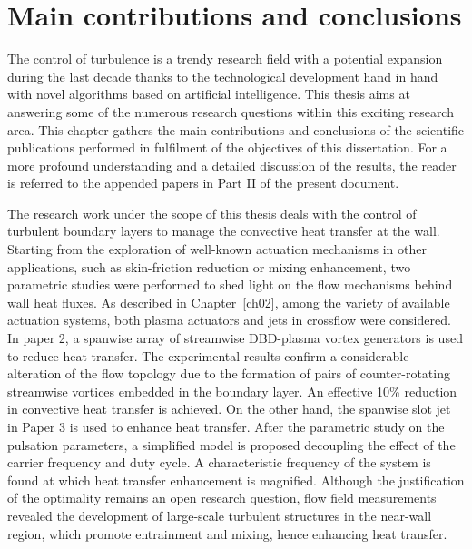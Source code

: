 \chapter{Main contributions and conclusions}\label{ch04}
%
The control of turbulence is a trendy research field with a potential expansion during the last decade thanks to the technological development hand in hand with novel algorithms based on artificial intelligence. This thesis aims at answering some of the numerous research questions within this exciting research area. This chapter gathers the main contributions and conclusions of the scientific publications performed in fulfilment of the objectives of this dissertation. For a more profound understanding and a detailed discussion of the results, the reader is referred to the appended papers in Part II of the present document.

The research work under the scope of this thesis deals with the control of turbulent boundary layers to manage the convective heat transfer at the wall. Starting from the exploration of well-known actuation mechanisms in other applications, such as skin-friction reduction or mixing enhancement, two parametric studies were performed to shed light on the flow mechanisms behind wall heat fluxes. As described in Chapter~\ref{ch02}, among the variety of available actuation systems, both plasma actuators and jets in crossflow were considered. In paper 2, a spanwise array of streamwise DBD-plasma vortex generators is used to reduce heat transfer. The experimental results confirm a considerable alteration of the flow topology due to the formation of pairs of counter-rotating streamwise vortices embedded in the boundary layer. An effective 10\% reduction in convective heat transfer is achieved. On the other hand, the spanwise slot jet in Paper 3 is used to enhance heat transfer. After the parametric study on the pulsation parameters, a simplified model is proposed decoupling the effect of the carrier frequency and duty cycle. A characteristic frequency of the system is found at which heat transfer enhancement is magnified. Although the justification of the optimality remains an open research question, flow field measurements revealed the development of large-scale turbulent structures in the near-wall region, which promote entrainment and mixing, hence enhancing heat transfer.

